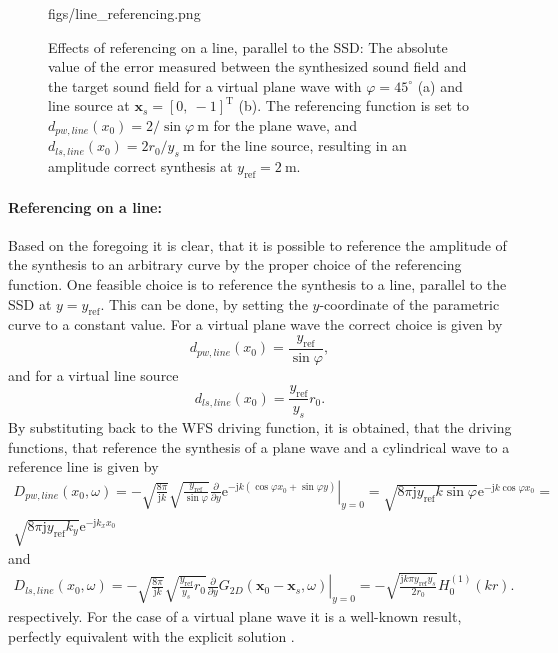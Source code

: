 \documentclass[12pt,a4paper]{article}
\newcommand{\te}{\mathrm{e}}
\newcommand{\ti}{\mathrm{j}}
\newcommand{\sinfi}{\sin\varphi}
\newcommand{\cosfi}{\cos\varphi}
\newcommand{\yref}{y_{\mathrm{ref}}}
\newcommand{\vxo}{\mathbf{x}_0}
\begin{document}
\begin{figure}
	\centering
	\begin{overpic}[width = 1\columnwidth ]{figs/line_referencing.png}
	\scriptsize
	\end{overpic}
\caption{Effects of referencing on a line, parallel to the SSD: The absolute value of the error measured between the synthesized sound field and the target sound field for a virtual plane wave with $\varphi = 45^{\circ}$ (a) and line source at $\mathbf{x}_s = [0,\ -1]^{\mathrm{T}}$ (b). The referencing function is set to $d_{pw,line}(x_0) = 2 / \sinfi ~\mathrm{m}$ for the plane wave, and $d_{ls,line}(x_0) = 2 r_0/y_s ~\mathrm{m}$ for the line source, resulting in an amplitude correct synthesis at $\yref = 2~\mathrm{m}$.}
	\label{Fig:Theory:line_referencing}
\end{figure}

\paragraph{Referencing on a line:\\}
Based on the foregoing it is clear, that it is possible to reference the amplitude of the synthesis to an arbitrary curve by the proper choice of the referencing function. 
One feasible choice is to reference the synthesis to a line, parallel to the SSD at $y=\yref$. This can be done, by setting the $y$-coordinate of the parametric curve to a constant value.
For a virtual plane wave the correct choice is given by
\begin{equation}
d_{pw,line}(x_0) = \frac{\yref}{\sinfi},
\end{equation}
and for a virtual line source 
\begin{equation}
d_{ls,line}(x_0) = \frac{\yref}{y_s} r_0.
\end{equation}
By substituting back to the WFS driving function, it is obtained, that the driving functions, that reference the synthesis of a plane wave and a cylindrical wave to a reference line is given by
\begin{multline}
D_{pw,line}(x_0,\omega) = 
- \sqrt{\frac{8\pi}{\ti k}}\sqrt{\frac{\yref}{\sinfi}} \left. \frac{\partial}{\partial y} \te^{-\ti k (\cosfi x_0 + \sinfi y)} \right|_{y = 0} = 
\sqrt{8\pi \ti \yref k \sinfi}\te^{-\ti k \cosfi x_0 } =\\ 
\sqrt{8\pi \ti \yref k_y }\te^{-\ti k_x x_0 }
\label{Eq:Plane_wave_ref_line}
\end{multline}
and
\begin{multline}
D_{ls,line}(x_0,\omega) = 
- \sqrt{\frac{8\pi}{\ti k}}\sqrt{\frac{\yref}{y_s} r_0} \left. \frac{\partial}{\partial y} G_{2D}(\vxo -  \mathbf{x}_s,\omega) \right|_{y = 0} =
- \sqrt{\frac{\ti k \pi \yref y_s}{2 r_0}}  H_0^{(1)}( k r ).
\end{multline}
respectively. For the case of a virtual plane wave it is a well-known result, perfectly equivalent with the explicit solution \cite{Ahrens2012}.
\end{document}
